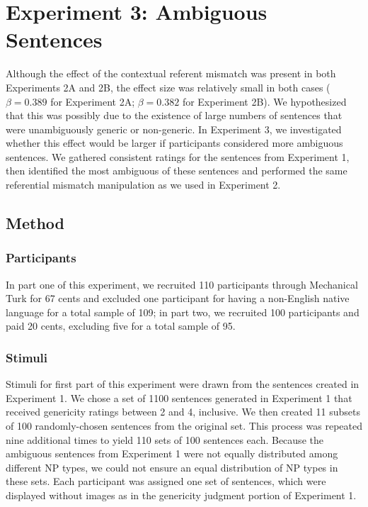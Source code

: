 \documentclass[10pt,letterpaper]{article}
\begin{document}



\section{Experiment 3: Ambiguous Sentences}

Although the effect of the contextual referent mismatch was present in both Experiments 2A and 2B, the effect size was relatively small in both cases (\(\beta = 0.389\) for Experiment 2A; \(\beta = 0.382\) for Experiment 2B). We hypothesized that this was possibly due to the existence of large numbers of sentences that were unambiguously generic or non-generic. In Experiment 3, we investigated whether this effect would be larger if participants considered more ambiguous sentences. We gathered consistent ratings for the sentences from Experiment 1, then identified the most ambiguous of these sentences and performed the same referential mismatch manipulation as we used in Experiment 2. 

\subsection{Method} 

\subsubsection{Participants}

In part one of this experiment, we recruited 110 participants through Mechanical Turk for 67 cents and excluded one participant for having a non-English native language for a total sample of 109; in part two, we recruited 100 participants and paid 20 cents, excluding five for a total sample of 95.

\subsubsection{Stimuli}  

Stimuli for first part of this experiment were drawn from the sentences created in Experiment 1. We chose a set of 1100 sentences generated in Experiment 1 that received genericity ratings between 2 and 4, inclusive. We then created 11 subsets of 100 randomly-chosen sentences from the original set. This process was repeated nine additional times to yield 110 sets of 100 sentences each. Because the ambiguous sentences from Experiment 1 were not equally distributed among different NP types, we could not ensure an equal distribution of NP types in these sets. Each participant was assigned one set of sentences, which were displayed without images as in the genericity judgment portion of Experiment 1.
\end{document}
